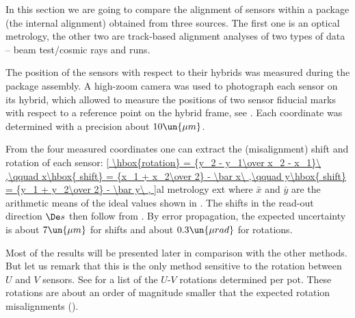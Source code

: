 In this section we are going to compare the alignment of sensors within a package (the internal alignment) obtained from three sources. The first one is an optical metrology, the other two are track-based alignment analyses of two types of data -- beam test/cosmic rays and  runs.


The position of the sensors with respect to their hybrids was measured during the package assembly. A high-zoom camera was used to photograph each sensor on its hybrid, which allowed to measure the positions of two sensor fiducial marks with respect to a reference point on the hybrid frame, see . Each coordinate was determined with a precision about $10\un{\mu m}$.


From the four measured coordinates one can extract the (misalignment) shift and rotation of each sensor:
\eqref{
	\hbox{rotation} = {y_2 - y_1\over x_2 - x_1}\ ,\qquad
	x\hbox{ shift} = {x_1 + x_2\over 2} - \bar x\ ,\qquad
	y\hbox{ shift} = {y_1 + y_2\over 2} - \bar y\ ,
}{al metrology ext}
where $\bar x$ and $\bar y$ are the arithmetic means of the ideal values shown in . The shifts in the read-out direction $\De s$ then follow from . By error propagation, the expected uncertainty is about $7\un{\mu m}$ for shifts and about $0.3\un{\mu rad}$ for rotations.

Most of the results will be presented later in comparison with the other methods. But let us remark that this is the only method sensitive to the rotation between $U$ and $V$ sensors. See  for a list of the $U$-$V$ rotations determined per pot. These rotations are about an order of magnitude smaller that the expected rotation misalignments ().


